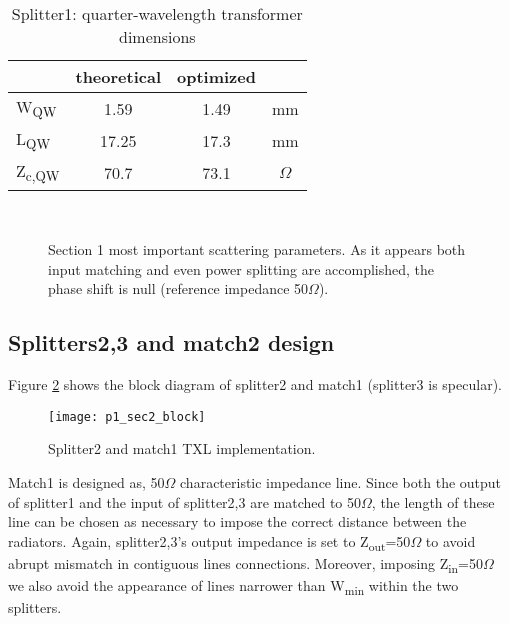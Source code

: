 \begin{table} [H]
	\label{tab:p1_sec1DimQW}
	\caption{Splitter1: quarter-wavelength transformer dimensions}
	\centering	
	\begin{tabular}{lccc} 
		\toprule
		& theoretical & optimized&\\
		\midrule 
		W\textsubscript{QW} 	&	1.59		&	1.49	& mm		\\
		L\textsubscript{QW}	&	17.25		& 	17.3		& mm	\\ 
		Z\textsubscript{c,QW}& 	70.7 &73.1	&$\Omega$ \\
		\bottomrule
	\end{tabular}	
\end{table}
\begin{figure}[p] 
	\centering
	\quad
	\\
	\caption{Section 1 most important scattering parameters. As it appears both input matching and even power splitting are accomplished, the phase shift is null (reference impedance 50$\Omega$).}
	\label{fig:p1_sec1Scatt}
\end{figure}
\newpage

\subsection{Splitters2,3 and match2 design}

Figure \ref{fig:p1_sec2_block} shows the block diagram of splitter2 and match1 (splitter3  is specular).
\begin{figure}[H] 
	\centering
	\texttt{[image: p1\_sec2\_block]}
	\caption{Splitter2 and match1 TXL implementation. }
	\label{fig:p1_sec2_block}
\end{figure}
Match1 is designed as, 50$\Omega$ characteristic impedance line. Since both the output of splitter1 and the input of splitter2,3 are matched to 50$\Omega$, the length of these line can be chosen as necessary to impose the correct distance between the radiators. Again, splitter2,3's output impedance is set to Z\textsubscript{out}=50$\Omega$ to avoid abrupt mismatch in contiguous lines connections. Moreover, imposing Z\textsubscript{in}=50$\Omega$ we also avoid the appearance of lines narrower than W\textsubscript{min} within the two splitters.


